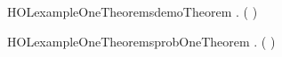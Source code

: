 \newcommand{\HOLexampleOneDate}{29 June 2017}
\newcommand{\HOLexampleOneTime}{09:51}
\begin{SaveVerbatim}{HOLexampleOneTheoremsdemoTheorem}
\HOLTokenTurnstile{} \HOLSymConst{\HOLTokenForall{}} .  \HOLSymConst{\HOLTokenImp{}} ( \HOLSymConst{\HOLTokenImp{}} ) \HOLSymConst{\HOLTokenImp{}} 
\end{SaveVerbatim}
\newcommand{\HOLexampleOneTheoremsdemoTheorem}{\UseVerbatim{HOLexampleOneTheoremsdemoTheorem}}
\begin{SaveVerbatim}{HOLexampleOneTheoremsprobOneTheorem}
\HOLTokenTurnstile{} \HOLSymConst{\HOLTokenForall{}} .  \HOLSymConst{\HOLTokenImp{}} ( \HOLSymConst{\HOLTokenImp{}} ) \HOLSymConst{\HOLTokenImp{}} 
\end{SaveVerbatim}
\newcommand{\HOLexampleOneTheoremsprobOneTheorem}{\UseVerbatim{HOLexampleOneTheoremsprobOneTheorem}}
\newcommand{\HOLexampleOneTheorems}{
\HOLThmTag{example1}{demoTheorem}\HOLexampleOneTheoremsdemoTheorem
\HOLThmTag{example1}{prob1Theorem}\HOLexampleOneTheoremsprobOneTheorem
}
